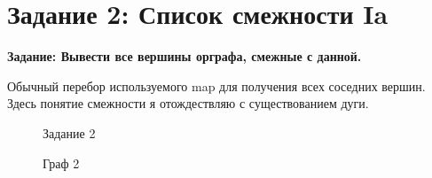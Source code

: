 \documentclass[otchet]{SCWorks}
\begin{document}
\section{Задание 2: Список смежности Ia}

\textbf{Задание: Вывести все вершины орграфа, смежные с данной.}

Обычный перебор используемого map для получения всех соседних вершин. Здесь понятие смежности я отождествляю с существованием дуги.

\begin{figure}[H]
	\caption{Задание 2}
	\label{pic2_1}
\end{figure}

\begin{figure}[H]
	\caption{Граф 2}
	\label{gr2_1}
\end{figure}
\end{document}
